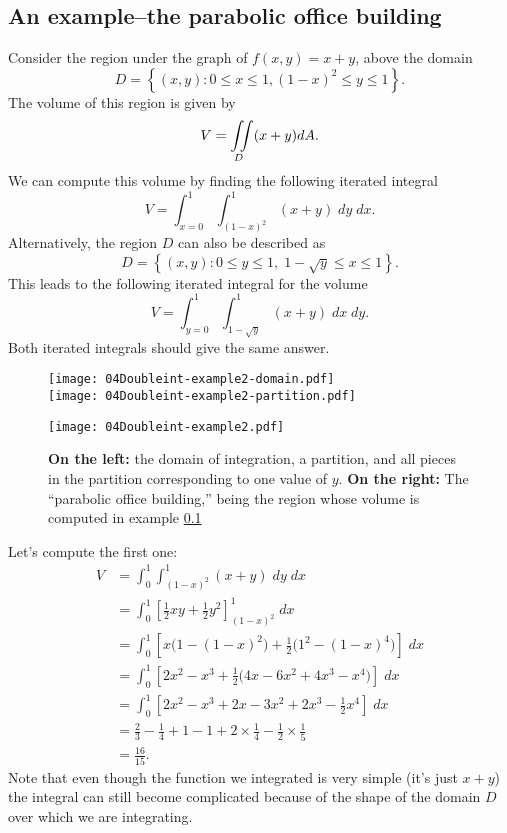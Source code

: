 \subsection{An example--the parabolic office building}  
\label{sec:04parabolic-office-building}
Consider the region under the graph of $f(x, y) = x+y$, above the
domain 
\[
D = \left\{ (x,y) : 0\le x\le 1, (1-x)^2\le y\le 1 \right\}.
\]
The volume of this region is given by
\[
V = \iint\limits_D (x+y)dA.
\]
We can compute this volume by finding the following iterated integral
\begin{equation}
  V = \int_{x=0}^1 \int_{(1-x)^2}^1 (x+y)\; dy\; dx.
  \label{eq:04parabolic-office-building-dy-dx}
\end{equation}
Alternatively, the region $D$ can also be described as
\[
D = \left\{ (x, y) : 0\le y\le 1,\;  1-\sqrt{y} \le x\le 1 \right\}.
\]
This leads to the following iterated integral for the volume
\begin{equation}
  V = \int_{y=0}^1 \int_{1-\surd y}^1 (x+y) \; dx\; dy.
  \label{eq:04parabolic-office-building-dy-dx}
\end{equation}
Both iterated integrals should give the same answer.
\begin{figure}[ht]
  \begin{minipage}[b]{0.4\textwidth}
    \texttt{[image: 04Doubleint-example2-domain.pdf]}\\
    \texttt{[image: 04Doubleint-example2-partition.pdf]}
  \end{minipage}
  \texttt{[image: 04Doubleint-example2.pdf]}

  \caption{\textbf{On the left: } the domain of integration, a partition, and
  all pieces in the partition corresponding to one value of $y$.
  \textbf{On the right: } The ``parabolic office building,'' being the
  region whose volume is computed in example
  \ref{sec:04parabolic-office-building}}
  \label{fig:04parabolic-office-building}
\end{figure}
Let's compute the first one:
\begin{align*}
  V&= \int_{0}^1 \int_{(1-x)^2}^1 (x+y)\; dy\; dx \\
  &=\int_0^1 \left[ \tfrac12 xy + \tfrac12y^2 \right]_{(1-x)^2}^1\; dx \\
  &=\int_0^1 \left[
                x\bigl(1-(1-x)^2\bigr) +
                  \tfrac12\bigl(1^2-(1-x)^4\bigr)
             \right]\; dx\\
  &=\int_0^1 \left[ 
  2x^2 - x^3 + \tfrac12\bigl(4x-6x^2+4x^3-x^4\bigr)
  \right]\; dx\\
  &=\int_0^1 \left[ 
          2x^2 - x^3 + 2x-3x^2+2x^3-\tfrac12x^4
  \right]\; dx\\
  &= \tfrac23 -\tfrac14 + 1 -1 + 2\times\tfrac14 - \tfrac12 \times\tfrac15\\
  &= \tfrac{16}{15}.
\end{align*}
Note that even though the function we integrated is very simple
(it's just $x+y$) the integral can still become complicated because
of the shape of the domain $D$ over which we are integrating.

